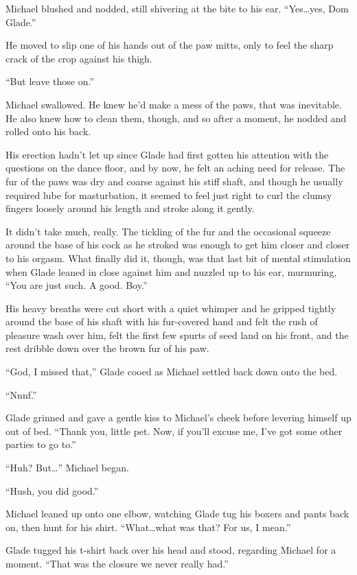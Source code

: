 \documentclass[12pt,letterpaper,oneside]{memoir}
\begin{document}
  Michael blushed and nodded, still shivering at the bite to his ear.  ``Yes\ldots{}yes, Dom Glade.''

  He moved to slip one of his hands out of the paw mitts, only to feel the sharp crack of the crop against his thigh.

  ``But leave those on.''

  Michael swallowed.  He knew he'd make a mess of the paws, that was inevitable.  He also knew how to clean them, though, and so after a moment, he nodded and rolled onto his back.

  His erection hadn't let up since Glade had first gotten his attention with the questions on the dance floor, and by now, he felt an aching need for release.  The fur of the paws was dry and coarse against his stiff shaft, and though he usually required lube for masturbation, it seemed to feel just right to curl the clumsy fingers loosely around his length and stroke along it gently.

  It didn't take much, really.  The tickling of the fur and the occasional squeeze around the base of his cock as he stroked was enough to get him closer and closer to his orgasm.  What finally did it, though, was that last bit of mental stimulation when Glade leaned in close against him and nuzzled up to his ear, murmuring, ``You are just such. A good. Boy.''

  His heavy breaths were cut short with a quiet whimper and he gripped tightly around the base of his shaft with his fur-covered hand and felt the rush of pleasure wash over him, felt the first few spurts of seed land on his front, and the rest dribble down over the brown fur of his paw.

  ``God, I missed that,'' Glade cooed as Michael settled back down onto the bed.

  ``Nnnf.''

  Glade grinned and gave a gentle kiss to Michael's cheek before levering himself up out of bed.  ``Thank you, little pet.  Now, if you'll excuse me, I've got some other parties to go to.''

  ``Huh?  But\ldots{}'' Michael began.

  ``Hush, you did good.''

  Michael leaned up onto one elbow, watching Glade tug his boxers and pants back on, then hunt for his shirt.  ``What\ldots{}what was that?  For us, I mean.''

  Glade tugged his t-shirt back over his head and stood, regarding Michael for a moment.  ``That was the closure we never really had.''
\end{document}
